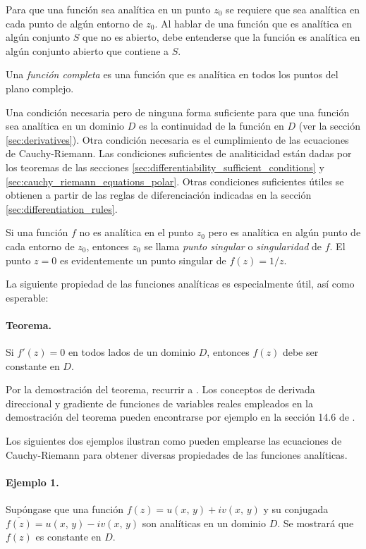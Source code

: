 \documentclass[a4paper]{report}
\begin{document}
Para que una función sea analítica en un punto \(z_0\) se requiere que sea analítica en cada punto de algún entorno de \(z_0\). Al hablar de una función que es analítica en algún conjunto \(S\) que no es abierto, debe entenderse que la función es analítica en algún conjunto abierto que contiene a \(S\).

Una \emph{función completa} es una función que es analítica en todos los puntos del plano complejo.

Una condición necesaria pero de ninguna forma suficiente para que una función sea analítica en un dominio \(D\) es la continuidad de la función en \(D\) (ver la sección \ref{sec:derivatives}). Otra condición necesaria es el cumplimiento de las ecuaciones de Cauchy-Riemann. Las condiciones suficientes de analiticidad están dadas por los teoremas de las secciones \ref{sec:differentiability_sufficient_conditions} y \ref{sec:cauchy_riemann_equations_polar}. Otras condiciones suficientes útiles se obtienen a partir de las reglas de diferenciación indicadas en la sección \ref{sec:differentiation_rules}.

Si una función \(f\) no es analítica en el punto \(z_0\) pero es analítica en algún punto de cada entorno de \(z_0\), entonces \(z_0\) se llama \emph{punto singular} o \emph{singularidad} de \(f\). El punto \(z=0\) es evidentemente un punto singular de \(f(z)=1/z\). 

La siguiente propiedad de las funciones analíticas es especialmente útil, así como esperable:
\paragraph{Teorema.} Si \(f'(z)=0\) en todos lados de un dominio \(D\), entonces \(f(z)\) debe ser constante en \(D\).

Por la demostración del teorema, recurrir a \cite{brown2013complex}. Los conceptos de derivada direccional y gradiente de funciones de variables reales empleados en la demostración del teorema pueden encontrarse por ejemplo en la sección 14.6 de \cite{stewart2016essential}.

Los siguientes dos ejemplos ilustran como pueden emplearse las ecuaciones de Cauchy-Riemann para obtener diversas propiedades de las funciones analíticas.

\paragraph{Ejemplo 1.} Supóngase que una función \(f(z)=u(x,\,y)+iv(x,\,y)\) y su conjugada \(\overline{f(z)}=u(x,\,y)-iv(x,\,y)\) son analíticas en un dominio \(D\). Se mostrará que \(f(z)\) es constante en \(D\).
\end{document}
